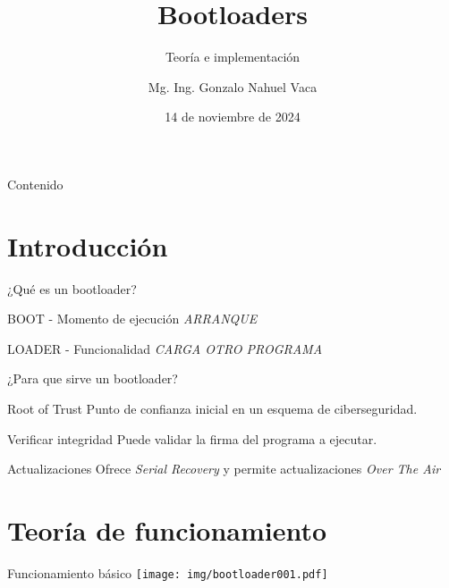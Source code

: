 \documentclass{beamer}
\title{Bootloaders}
\subtitle{Teoría e implementación}
\author{Mg. Ing. Gonzalo Nahuel Vaca}
\institute{AADECA}
\date{14 de noviembre de 2024} %
\begin{document}
\begin{frame}
    \titlepage
\end{frame}

\begin{frame}{Contenido}
    \tableofcontents
\end{frame}

\section{Introducción}
\begin{frame}
    \sectionpage %
\end{frame}

\begin{frame}{¿Qué es un bootloader?}
    \begin{block}{BOOT - Momento de ejecución}
        \emph{ARRANQUE}
    \end{block}
    \begin{block}{LOADER - Funcionalidad}
        \emph{CARGA OTRO PROGRAMA}
    \end{block}
\end{frame}

\begin{frame}{¿Para que sirve un bootloader?}
    \begin{block}{Root of Trust}
        Punto de confianza inicial en un esquema de ciberseguridad.
    \end{block}
    \begin{block}{Verificar integridad}
        Puede validar la firma del programa a ejecutar.
    \end{block}
    \begin{block}{Actualizaciones}
        Ofrece \emph{Serial Recovery} y permite actualizaciones \emph{Over The Air}
    \end{block}
\end{frame}

\section{Teoría de funcionamiento}
\begin{frame}
    \sectionpage %
\end{frame}

\begin{frame}{Funcionamiento básico}
    \centering
    \texttt{[image: img/bootloader001.pdf]}
\end{frame}
\end{document}
